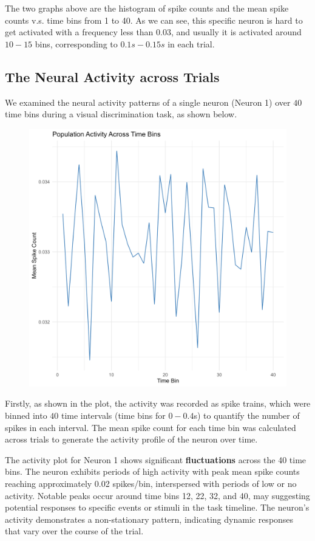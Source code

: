 \documentclass{article}
\begin{document}
	\par The two graphs above are the histogram of spike counts and the mean spike counts v.s. time bins from 1 to 40. As we can see, this specific neuron is hard to get activated with a frequency less than $0.03$, and usually it is activated around $10-15$ bins, corresponding to $0.1s-0.15s$ in each trial.
	\clearpage
	\subsection{The Neural Activity across Trials}
	\par We examined the neural activity patterns of a single neuron (Neuron 1) over $40$ time bins during a visual discrimination task, as shown below.
	\begin{figure}[htbp]
		\centering
		\includegraphics[scale = 0.3]{Pics/010}
		\label{fig:010}
	\end{figure}
	\par Firstly, as shown in the plot, the activity was recorded as spike trains, which were binned into $40$ time intervals (time bins for $0-0.4$s) to quantify the number of spikes in each interval. The mean spike count for each time bin was calculated across trials to generate the activity profile of the neuron over time.
	\par The activity plot for Neuron 1 shows significant \textbf{fluctuations} across the 40 time bins. The neuron exhibits periods of high activity with peak mean spike counts reaching approximately 0.02 spikes/bin, interspersed with periods of low or no activity. Notable peaks occur around time bins 12, 22, 32, and 40, may suggesting potential responses to specific events or stimuli in the task timeline. The neuron's activity demonstrates a non-stationary pattern, indicating dynamic responses that vary over the course of the trial.
\end{document}
